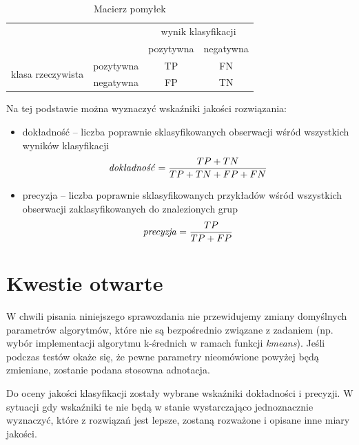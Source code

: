 \documentclass[11pt,a4paper,twoside]{article}
\begin{document}
\begin{table}[ht]
\centering
\caption{Macierz pomyłek}
\label{confusionMatrix}
\begin{tabular}{|*{4}{c|}}
\cline{3-4}
  \multicolumn{2}{c}{} & \multicolumn{2}{|c|}{wynik klasyfikacji}\\\cline{3-4}
  \multicolumn{2}{c|}{} & pozytywna & negatywna\\\hline
  \multirow{2}{*}{klasa rzeczywista}& pozytywna & TP & FN\\\cline{2-4}
  & negatywna & FP & TN\\\hline
\end{tabular}
\end{table}

Na tej podstawie można wyznaczyć wskaźniki jakości rozwiązania:
\begin{itemize}[label={--}]
\item dokładność -- liczba poprawnie sklasyfikowanych obserwacji wśród wszystkich wyników klasyfikacji $$\text{\emph{dokładność}} = \frac{TP+TN}{TP+TN+FP+FN}$$
\item precyzja -- liczba poprawnie sklasyfikowanych przykładów wśród wszystkich obserwacji zaklasyfikowanych do znalezionych grup $$\text{\emph{precyzja}} = \frac{TP}{TP+FP}$$
\end{itemize}


\section{Kwestie otwarte}
W chwili pisania niniejszego sprawozdania nie przewidujemy zmiany domyślnych parametrów algorytmów, które nie są bezpośrednio związane z zadaniem (np. wybór implementacji algorytmu k-średnich w ramach funkcji \textit{kmeans}). Jeśli podczas testów okaże się, że pewne parametry nieomówione powyżej będą zmieniane, zostanie podana stosowna adnotacja.

Do oceny jakości klasyfikacji zostały wybrane wskaźniki dokładności i precyzji. W sytuacji gdy wskaźniki te nie będą w stanie wystarczająco jednoznacznie wyznaczyć, które z rozwiązań jest lepsze, zostaną rozważone i opisane inne miary jakości.
\end{document}
